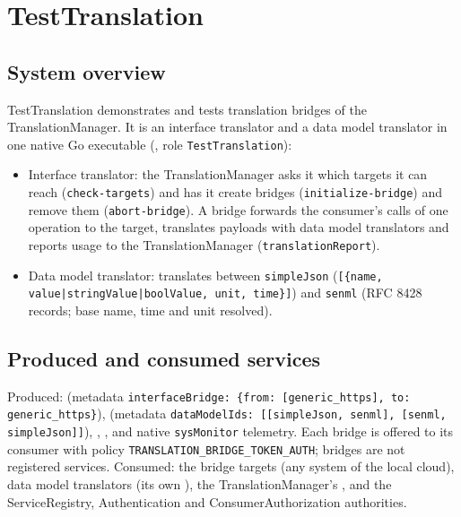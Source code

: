 \documentclass[a4paper]{arrowhead}
\begin{document}
\ArrowheadSetup
\section{TestTranslation}
\subsection{System overview}
TestTranslation demonstrates and tests translation bridges of the TranslationManager. It is an interface translator and a data model translator in one native Go executable (, role \texttt{TestTranslation}):
\begin{itemize}
\item Interface translator: the TranslationManager asks it which targets it can reach (\texttt{check-targets}) and has it create bridges (\texttt{initialize-bridge}) and remove them (\texttt{abort-bridge}). A bridge forwards the consumer's calls of one operation to the target, translates payloads with data model translators and reports usage to the TranslationManager (\texttt{translationReport}).
\item Data model translator: translates between \texttt{simpleJson} (\texttt{[\{name, value|stringValue|boolValue, unit, time\}]}) and \texttt{senml} (RFC 8428 records; base name, time and unit resolved).
\end{itemize}
\subsection{Produced and consumed services}
Produced:  (metadata \texttt{interfaceBridge: \{from: [generic\_https], to: generic\_https\}}),  (metadata \texttt{dataModelIds: [[simpleJson, senml], [senml, simpleJson]]}), , , and native \texttt{sysMonitor} telemetry. Each bridge is offered to its consumer with policy \texttt{TRANSLATION\_BRIDGE\_TOKEN\_AUTH}; bridges are not registered services.
Consumed: the bridge targets (any system of the local cloud), data model translators (its own ), the TranslationManager's , and the ServiceRegistry, Authentication and ConsumerAuthorization authorities.
\end{document}
